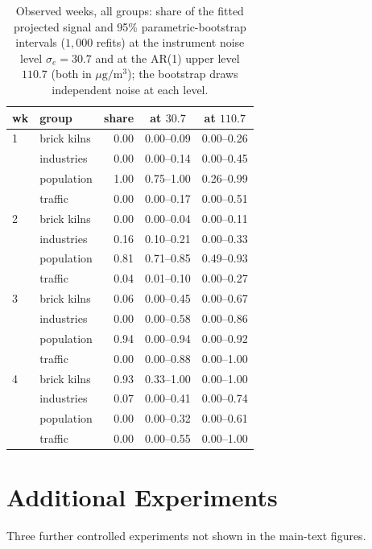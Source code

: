 \begin{table}[t]
\centering
\footnotesize
\setlength{\tabcolsep}{4pt}
\caption{Observed weeks, all groups: share of the fitted projected signal and 95\%
parametric-bootstrap intervals (\(1{,}000\) refits) at the instrument noise level
\(\sigma_e=30.7\) and at the AR(1) upper level \(110.7\) (both in
\(\mu\mathrm g/\mathrm m^3\)); the bootstrap draws independent noise at each level.}
\label{tab:observed_shares_full}
\vspace{3pt}
\begin{tabular}{llrcc}
\toprule
wk & group & share & at \(30.7\) & at \(110.7\) \\
\midrule
1 & brick kilns & 0.00 & 0.00--0.09 & 0.00--0.26 \\
 & industries & 0.00 & 0.00--0.14 & 0.00--0.45 \\
 & population & 1.00 & 0.75--1.00 & 0.26--0.99 \\
 & traffic & 0.00 & 0.00--0.17 & 0.00--0.51 \\
\midrule
2 & brick kilns & 0.00 & 0.00--0.04 & 0.00--0.11 \\
 & industries & 0.16 & 0.10--0.21 & 0.00--0.33 \\
 & population & 0.81 & 0.71--0.85 & 0.49--0.93 \\
 & traffic & 0.04 & 0.01--0.10 & 0.00--0.27 \\
\midrule
3 & brick kilns & 0.06 & 0.00--0.45 & 0.00--0.67 \\
 & industries & 0.00 & 0.00--0.58 & 0.00--0.86 \\
 & population & 0.94 & 0.00--0.94 & 0.00--0.92 \\
 & traffic & 0.00 & 0.00--0.88 & 0.00--1.00 \\
\midrule
4 & brick kilns & 0.93 & 0.33--1.00 & 0.00--1.00 \\
 & industries & 0.07 & 0.00--0.41 & 0.00--0.74 \\
 & population & 0.00 & 0.00--0.32 & 0.00--0.61 \\
 & traffic & 0.00 & 0.00--0.55 & 0.00--1.00 \\
\bottomrule
\end{tabular}
\end{table}

\section{Additional Experiments}
\label{app:additional_experiments}

Three further controlled experiments not shown in the main-text figures.


